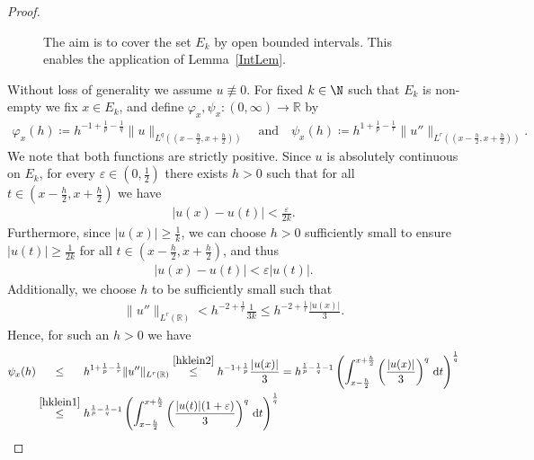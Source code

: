\documentclass{article}
\newcommand{\dd}{\mathop{}\mathrm{d}} %
\newcommand{\eps}{\varepsilon}
\renewcommand{\phi}{\varphi}
\numberwithin{figure}{section}
\newcommand{\R}{\mathbb{R}}
\numberwithin{equation}{section}
\begin{document}
\begin{proof}
\begin{figure}[htb]
\caption{The aim is to cover the set $E_k$ by open bounded intervals. This enables the application of Lemma~\ref{IntLem}.}
\end{figure}


\noindent Without loss of generality we assume $u \not\equiv 0$. For fixed $k \in \N$ such that $E_k$ is non-empty we fix $x \in E_k$, and define $\phi_x,\psi_x : (0, \infty) \to \R$ by
\begin{align} \label{defphipsi}
    \phi_x(h)\coloneq h^{-1+\frac 1p - \frac 1q} \|u\|_{L^q((x-\frac h2, x+\frac h2))} \quad \text{and} \quad 
    \psi_x(h)\coloneq h^{1+\frac 1p - \frac 1r} \|u''\|_{L^r((x-\frac h2, x+\frac h2))}.
\end{align}
We note that both functions are strictly positive. Since $u$ is absolutely continuous on $E_k$, for every $\eps \in (0, \frac 12)$ there exists $h > 0$ such that for all $t \in (x- \frac h2, x + \frac h2)$ we have
\begin{align}
    |u(x)-u(t)| < \frac{\eps}{2k}.
\end{align}
Furthermore, since $|u(x)| \geq \frac 1k$, we can choose $h>0$ sufficiently small to ensure $|u(t)| \geq \frac{1}{2k}$ for all $t \in (x- \frac h2, x + \frac h2)$, and thus
\begin{align} \label{hklein1}
    |u(x)-u(t)| < \eps |u(t)|.
\end{align}
Additionally, we choose $h$ to be sufficiently small such that
\begin{align} \label{hklein2}
    \|u''\|_{L^r(\R)} < h^{-2+\frac 1r} \frac{1}{3k} \leq h^{-2+\frac 1r} \frac{|u(x)|}{3}.
\end{align}
Hence, for such an $h > 0$ we have
\begin{align}
    \psi_x(h) & \overset{\hphantom{\eqref{hklein1}}}{\leq} h^{1+ \frac 1p - \frac 1r} \|u''\|_{L^r(\R)} 
    \overset{\eqref{hklein2}}{\leq} h^{-1 + \frac 1p} \frac{|u(x)|}{3} = h^{\frac 1p - \frac 1q -1} \left( \int_{x-\frac h2}^{x+ \frac h2} \left(\frac{|u(x)|}{3}\right)^q\dd t\right)^{\frac 1q} \\
    & \overset{\eqref{hklein1}}{\leq} h^{\frac 1p - \frac 1q -1} \left( \int_{x-\frac h2}^{x+ \frac h2} \left(\frac{|u(t)|(1+\eps)}{3}\right)^q\dd t\right)^{\frac 1q} 

\end{align}
\end{proof}
\end{document}
